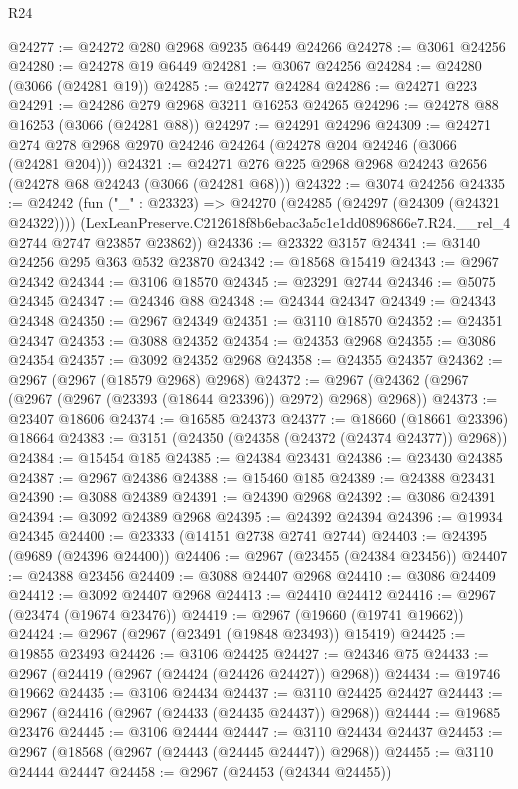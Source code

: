 \begin{lexlean}{R24}
\begin{coremodule}
@24277 := @24272 @280 @2968 @9235 @6449 @24266
@24278 := @3061 @24256
@24280 := @24278 @19 @6449
@24281 := @3067 @24256
@24284 := @24280 (@3066 (@24281 @19))
@24285 := @24277 @24284
@24286 := @24271 @223
@24291 := @24286 @279 @2968 @3211 @16253 @24265
@24296 := @24278 @88 @16253 (@3066 (@24281 @88))
@24297 := @24291 @24296
@24309 := @24271 @274 @278 @2968 @2970 @24246 @24264 (@24278 @204 @24246 (@3066 (@24281 @204)))
@24321 := @24271 @276 @225 @2968 @2968 @24243 @2656 (@24278 @68 @24243 (@3066 (@24281 @68)))
@24322 := @3074 @24256
@24335 := @24242
    (fun ("_" : @23323) =>
    @24270
      (@24285 (@24297 (@24309 (@24321 @24322))))
      (LexLeanPreserve.C212618f8b6ebac3a5c1e1dd0896866e7.R24.__rel_4 @2744 @2747 @23857 @23862))
@24336 := @23322 @3157
@24341 := @3140 @24256 @295 @363 @532 @23870
@24342 := @18568 @15419
@24343 := @2967 @24342
@24344 := @3106 @18570
@24345 := @23291 @2744
@24346 := @5075 @24345
@24347 := @24346 @88
@24348 := @24344 @24347
@24349 := @24343 @24348
@24350 := @2967 @24349
@24351 := @3110 @18570
@24352 := @24351 @24347
@24353 := @3088 @24352
@24354 := @24353 @2968
@24355 := @3086 @24354
@24357 := @3092 @24352 @2968
@24358 := @24355 @24357
@24362 := @2967 (@2967 (@18579 @2968) @2968)
@24372 := @2967 (@24362 (@2967 (@2967 (@2967 (@23393 (@18644 @23396)) @2972) @2968) @2968))
@24373 := @23407 @18606
@24374 := @16585 @24373
@24377 := @18660 (@18661 @23396) @18664
@24383 := @3151 (@24350 (@24358 (@24372 (@24374 @24377)) @2968))
@24384 := @15454 @185
@24385 := @24384 @23431
@24386 := @23430 @24385
@24387 := @2967 @24386
@24388 := @15460 @185
@24389 := @24388 @23431
@24390 := @3088 @24389
@24391 := @24390 @2968
@24392 := @3086 @24391
@24394 := @3092 @24389 @2968
@24395 := @24392 @24394
@24396 := @19934 @24345
@24400 := @23333 (@14151 @2738 @2741 @2744)
@24403 := @24395 (@9689 (@24396 @24400))
@24406 := @2967 (@23455 (@24384 @23456))
@24407 := @24388 @23456
@24409 := @3088 @24407 @2968
@24410 := @3086 @24409
@24412 := @3092 @24407 @2968
@24413 := @24410 @24412
@24416 := @2967 (@23474 (@19674 @23476))
@24419 := @2967 (@19660 (@19741 @19662))
@24424 := @2967 (@2967 (@23491 (@19848 @23493)) @15419)
@24425 := @19855 @23493
@24426 := @3106 @24425
@24427 := @24346 @75
@24433 := @2967 (@24419 (@2967 (@24424 (@24426 @24427)) @2968))
@24434 := @19746 @19662
@24435 := @3106 @24434
@24437 := @3110 @24425 @24427
@24443 := @2967 (@24416 (@2967 (@24433 (@24435 @24437)) @2968))
@24444 := @19685 @23476
@24445 := @3106 @24444
@24447 := @3110 @24434 @24437
@24453 := @2967 (@18568 (@2967 (@24443 (@24445 @24447)) @2968))
@24455 := @3110 @24444 @24447
@24458 := @2967 (@24453 (@24344 @24455))

\end{coremodule}
\end{lexlean}
